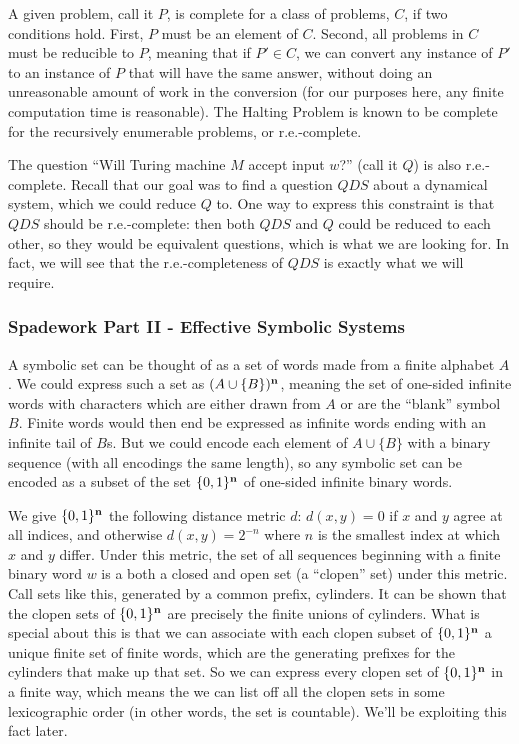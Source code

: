 \documentclass{fkpaper}
\begin{document}
\begin{multicols}{2}
A given problem, call it $P$, is complete for a class of problems,
$C$, if two conditions hold. First, $P$ must be an element of $C$.
Second, all problems in $C$ must be reducible to $P$, meaning that if
$P' \in C$, we can convert any instance of $P'$ to an instance of $P$
that will have the same answer, without doing an unreasonable amount
of work in the conversion (for our purposes here, any finite
computation time is reasonable). The Halting Problem is known to be
complete for the recursively enumerable problems, or r.e.-complete.

The question ``Will Turing machine $M$ accept input $w$?'' (call it
$Q$) is also r.e.-complete. Recall that our goal was to find a
question $QDS$ about a dynamical system, which we could reduce $Q$ to.
One way to express this constraint is that $QDS$ should be
r.e.-complete: then both $QDS$ and $Q$ could be reduced to each other,
so they would be equivalent questions, which is what we are looking
for. In fact, we will see that the r.e.-completeness of $QDS$ is
exactly what we will require.

\subsubsection*{Spadework Part II - Effective Symbolic Systems}

A symbolic set can be thought of as a set of words made from a finite alphabet $A$. We could express such a set as $(A \cup \{B\})^{\mathbf{n}}$, meaning the set of one-sided infinite words with characters which are either drawn from $A$ or are the ``blank'' symbol $B$. Finite words would then end be expressed as infinite words ending with an infinite tail of $B$s. But we could encode each element of $A \cup \{B\}$ with a binary sequence (with all encodings the same length), so any symbolic set can be encoded as a subset of the set $\{0,1\}^{\mathbf{n}}$ of one-sided infinite binary words.

We give $\{0,1\}^{\mathbf{n}}$ the following distance metric $d$: $d(x,y) = 0$ if $x$ and $y$ agree at all indices, and otherwise $d(x,y) = 2^{-n}$ where $n$ is the smallest index at which $x$ and $y$ differ. Under this metric, the set of all sequences beginning with a finite binary word $w$ is a both a closed and open set (a ``clopen'' set) under this metric. Call sets like this, generated by a common prefix, cylinders. It can be shown that the clopen sets of $\{0,1\}^{\mathbf{n}}$ are precisely the finite unions of cylinders. What is special about this is that we can associate with each clopen subset of $\{0,1\}^{\mathbf{n}}$ a unique finite set of finite words, which are the generating prefixes for the cylinders that make up that set. So we can express every clopen set of $\{0,1\}^{\mathbf{n}}$ in a finite way, which means the we can list off all the clopen sets in some lexicographic order (in other words, the set is countable). We'll be exploiting this fact later.


\end{multicols}
\end{document}
